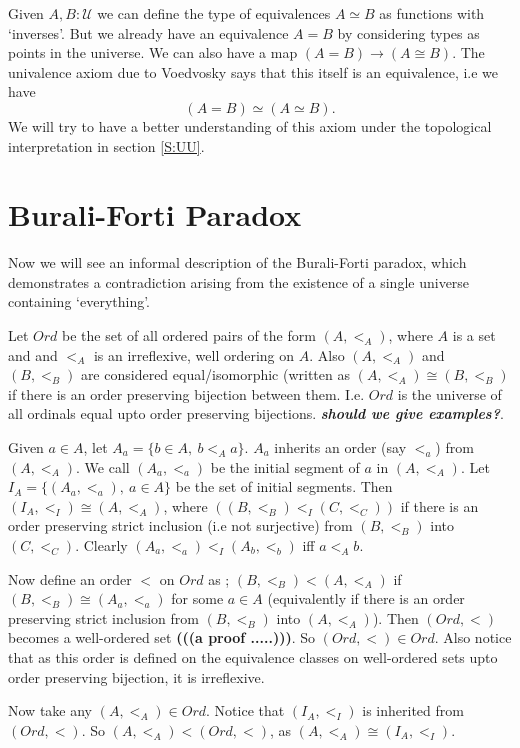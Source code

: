 \documentclass[10pt]{article}
\theoremstyle{definition}
\theoremstyle{plain}
\theoremstyle{remark}
\newcommand{\U}{\mathscr{U}}
\begin{document}
Given $A, B:\U$ we can define the type of equivalences $A\simeq B$ as functions
with `inverses'. But we already have an equivalence $A = B$ by considering types as points
in the universe. We can also have a map $(A = B) \to (A \cong B)$. The univalence axiom 
due to Voedvosky says that this itself is an equivalence, i.e we have
\[ (A = B) \simeq (A \simeq B).\]
We will try to have a better understanding of this axiom under the topological interpretation
in section \ref{S:UU}.

\section{Burali-Forti Paradox}\label{S:BFP}

Now we will see an informal description of the Burali-Forti paradox, which demonstrates a
contradiction arising from the existence of a single universe containing `everything'.\smallskip

Let $Ord$ be the set of all ordered pairs of the form $(A, <_A)$, where $A$ is a set and
and $<_A$ is an irreflexive, well ordering on $A$. Also $(A, <_A)$ and $(B, <_B)$ are 
considered equal/isomorphic (written as $(A,<_A) \cong (B,<_B)$ if there is an order 
preserving bijection between them. I.e. $Ord$ is the universe of all ordinals equal upto 
order preserving bijections. \textbf{\textit{should we give examples?}}.\smallskip

Given $a\in A$, let $A_a = \{b \in A,\ b <_A a \}$. $A_a$ inherits an order (say $<_a$)
from $(A, <_A)$. We call $(A_a, <_a)$ be the initial segment of $a$ in $(A, <_A)$. Let
$I_A = \{(A_a, <_a),\ a\in A\}$ be the set of initial segments. Then 
$(I_A,<_I) \cong (A, <_A)$, where $((B,<_B) <_I (C,<_C))$ if there is an order preserving 
strict inclusion (i.e not surjective) from $(B,<_B)$ into $(C,<_C)$. Clearly 
$(A_a,<_a) <_I (A_b,<_b)$ iff $a <_A b$.\smallskip

Now define an order $<$ on $Ord$ as ; $(B,<_B) < (A, <_A)$ if $(B, <_B) \cong (A_a, <_a)$ 
for some $a \in A$ (equivalently if there is an order preserving strict inclusion 
from $(B,<_B)$ into $(A,<_A)$). Then $(Ord, <)$ becomes a well-ordered set 
\textbf{(((a proof .....)))}. So $(Ord, <) \in Ord$. Also notice that as this order is defined 
on the equivalence classes on well-ordered sets upto order preserving bijection, it is 
irreflexive.\smallskip

Now take any $(A, <_A)\in Ord$. Notice that $(I_A, <_I)$ is inherited from ${(Ord, <)}$. So
$(A, <_A) < (Ord, <)$, as $(A,<_A) \cong (I_A, <_I)$.\smallskip
\end{document}

